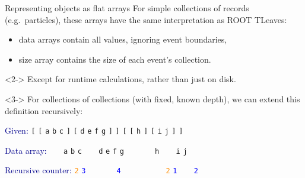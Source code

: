 \documentclass{beamer}
\begin{document}
\begin{frame}{Representing objects as flat arrays}
\vspace{0.3 cm}
For simple collections of records (e.g.\ particles), these arrays have the same interpretation as ROOT TLeaves:
\begin{itemize}
\item data arrays contain all values, ignoring event boundaries,
\item size array contains the size of each event's collection.
\end{itemize}

\vfill
\begin{uncoverenv}<2->
Except for runtime calculations, rather than just on disk.
\end{uncoverenv}

\vfill
\begin{uncoverenv}<3->
For collections of collections (with fixed, known depth), we can extend this definition recursively:

\vspace{0.3 cm}
\textcolor{darkblue}{Given:} \hfill {\tt [} {\tt [} {\tt a} {\tt b} {\tt c} {\tt ]} {\tt [} {\tt d} {\tt e} {\tt f} {\tt g} {\tt ]} {\tt ]} {\tt [} {\tt [} {\tt h} {\tt ]} {\tt [} {\tt i} {\tt j} {\tt ]} {\tt ]}

\textcolor{darkblue}{Data array:} \hfill {\tt \ } {\tt \ } {\tt a} {\tt b} {\tt c} {\tt \ } {\tt \ } {\tt d} {\tt e} {\tt f} {\tt g} {\tt \ } {\tt \ } {\tt \ } {\tt \ } {\tt h} {\tt \ } {\tt \ } {\tt i} {\tt j} {\tt \ } {\tt \ }

\textcolor{darkblue}{Recursive counter:} \hfill \textcolor{darkorange}{\tt 2} \textcolor{blue}{\tt 3} {\tt \ } {\tt \ } {\tt \ } {\tt \ } \textcolor{blue}{\tt 4} {\tt \ } {\tt \ } {\tt \ } {\tt \ } {\tt \ } {\tt \ } \textcolor{darkorange}{\tt 2} \textcolor{blue}{\tt 1} {\tt \ } {\tt \ } \textcolor{blue}{\tt 2} {\tt \ } {\tt \ } {\tt \ } {\tt \ }
\end{uncoverenv}
\end{frame}
\end{document}
